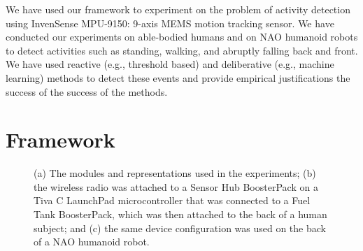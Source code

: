 \documentclass[letterpaper]{article}
\begin{document}
We have used our framework to experiment on the problem of activity
detection using InvenSense MPU-9150: 9-axis MEMS motion tracking sensor. We have conducted our
experiments on able-bodied humans and on NAO humanoid robots to detect activities such as standing,
walking, and abruptly falling back and front. We have used reactive (e.g., threshold based) 
and deliberative (e.g., machine learning) methods to detect these events and provide empirical  
justifications the success of the success of the methods. 

\section{Framework}

\begin{figure}[!t]
\centering
{} 
\caption{(a) The modules and representations used in the experiments;  (b) the wireless radio was 
attached to a Sensor Hub BoosterPack on a Tiva C LaunchPad microcontroller that was connected to a 
Fuel Tank BoosterPack, which was then attached to the back of a human subject; and (c) the same 
device configuration was used on the back of a NAO humanoid robot.}
 \label{fig:framework}
\end{figure}
\end{document}

